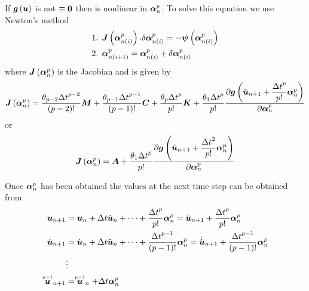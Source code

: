 If $\fnof{\vect{g}}{\vect{u}}$ is not $\equiv\vect{0}$ then
 is nonlinear in $\vect{\alpha}^{p}_{n}$. To solve this
equation we use Newton's method \ie
\begin{equation}
  \begin{split}
    \text{1.  } & \fnof{\matr{J}}{\vect{\alpha}^{p}_{n(i)}}.\delta
    \vect{\alpha}^{p}_{n(i)} = 
    -\fnof{\vect{\psi}}{\vect{\alpha}^{p}_{n(i)}} \\
    \text{2.  } & \vect{\alpha}^{p}_{n(i+1)}=\vect{\alpha}^{p}_{n(i)}+\delta
    \vect{\alpha}^{p}_{n(i)}
  \end{split}
\end{equation}
where $\fnof{\matr{J}}{\vect{\alpha}^{p}_{n}}$ is the Jacobian and is given by
\begin{equation}
  \fnof{\matr{J}}{\vect{\alpha}^{p}_{n}}=\dfrac{\theta_{p-2}{\Delta t}^{p-2}}{\factorial{p-2}}\matr{M}+
  \dfrac{\theta_{p-1}{\Delta
      t}^{p-1}}{\factorial{p-1}}\matr{C}+\dfrac{\theta_{p}{\Delta t}^{p}}{p!}\matr{K}+
  \dfrac{\theta_{1}{\Delta t}^{p}}{p!}
  \delby{\fnof{\vect{g}}{\hat{\vect{u}}_{n+1}+\dfrac{{\Delta
          t}^{p}}{p!}
      \vect{\alpha}^{p}_{n}}}{\vect{\alpha}^{p}_{n}}
\end{equation}
or
\begin{equation}
  \fnof{\matr{J}}{\vect{\alpha}^{p}_{n}}=\matr{A}+\dfrac{\theta_{1}{\Delta
      t}^{p}}{p!}
  \delby{\fnof{\vect{g}}{\hat{\vect{u}}_{n+1}+\dfrac{{\Delta t}^{2}}{p!}\vect{\alpha}^{p}_{n}}}{\vect{\alpha}^{p}_{n}}
\end{equation}

Once $\vect{\alpha}^{p}_{n}$ has been obtained the values at the next time step can be obtained from
\begin{equation}
  \begin{split}
    \vect{u}_{n+1} &= \vect{u}_{n}+\Delta t
    \dot{\vect{u}}_{n}+\cdots+\dfrac{{\Delta
        t}^{p}}{p!}\vect{\alpha}^{p}_{n}=\hat{\vect{u}}_{n+1}+
    \dfrac{{\Delta t}^{p}}{p!}\vect{\alpha}^{p}_{n}\\
    \dot{\vect{u}}_{n+1} &= \dot{\vect{u}}_{n}+\Delta t
    \ddot{\vect{u}}_{n}+\cdots+\dfrac{{\Delta
        t}^{p-1}}{\factorial{p-1}}\vect{\alpha}^{p}_{n}=\dot{\hat{\vect{u}}}_{n+1}+\dfrac{{\Delta
        t}^{p-1}}{\factorial{p-1}}\vect{\alpha}^{p}_{n} \\
    &\vdots \\
    \symover{p-1}{\vect{u}}_{n+1} &= \symover{p-1}{\vect{u}}_{n}+\Delta t\vect{\alpha}^{p}_{n}
  \end{split}
\end{equation}

